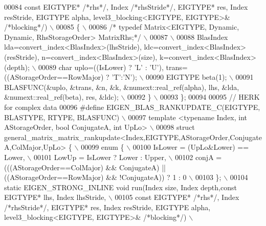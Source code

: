 \begin{DoxyCode}
00084 \textcolor{preprocessor}{                          const EIGTYPE* }\textcolor{comment}{/*rhs*/}\textcolor{preprocessor}{, Index }\textcolor{comment}{/*rhsStride*/}\textcolor{preprocessor}{, EIGTYPE* res, Index resStride,
       EIGTYPE alpha, level3\_blocking<EIGTYPE, EIGTYPE>& }\textcolor{comment}{/*blocking*/}\textcolor{preprocessor}{) \(\backslash\)}
00085 \textcolor{preprocessor}{  \{ \(\backslash\)}
00086 \textcolor{preprocessor}{  }\textcolor{comment}{/* typedef Matrix<EIGTYPE, Dynamic, Dynamic, RhsStorageOrder> MatrixRhs;*/}\textcolor{preprocessor}{ \(\backslash\)}
00087 \textcolor{preprocessor}{\(\backslash\)}
00088 \textcolor{preprocessor}{   BlasIndex lda=convert\_index<BlasIndex>(lhsStride), ldc=convert\_index<BlasIndex>(resStride),
       n=convert\_index<BlasIndex>(size), k=convert\_index<BlasIndex>(depth); \(\backslash\)}
00089 \textcolor{preprocessor}{   char uplo=((IsLower) ? 'L' : 'U'), trans=((AStorageOrder==RowMajor) ? 'T':'N'); \(\backslash\)}
00090 \textcolor{preprocessor}{   EIGTYPE beta(1); \(\backslash\)}
00091 \textcolor{preprocessor}{   BLASFUNC(&uplo, &trans, &n, &k, &numext::real\_ref(alpha), lhs, &lda, &numext::real\_ref(beta), res,
       &ldc); \(\backslash\)}
00092 \textcolor{preprocessor}{  \} \(\backslash\)}
00093 \textcolor{preprocessor}{\};}
00094 
00095 \textcolor{comment}{// HERK for complex data}
00096 \textcolor{preprocessor}{#define EIGEN\_BLAS\_RANKUPDATE\_C(EIGTYPE, BLASTYPE, RTYPE, BLASFUNC) \(\backslash\)}
00097 \textcolor{preprocessor}{template <typename Index, int AStorageOrder, bool ConjugateA, int  UpLo> \(\backslash\)}
00098 \textcolor{preprocessor}{struct general\_matrix\_matrix\_rankupdate<Index,EIGTYPE,AStorageOrder,ConjugateA,ColMajor,UpLo> \{ \(\backslash\)}
00099 \textcolor{preprocessor}{  enum \{ \(\backslash\)}
00100 \textcolor{preprocessor}{    IsLower = (UpLo&Lower) == Lower, \(\backslash\)}
00101 \textcolor{preprocessor}{    LowUp = IsLower ? Lower : Upper, \(\backslash\)}
00102 \textcolor{preprocessor}{    conjA = (((AStorageOrder==ColMajor) && ConjugateA) || ((AStorageOrder==RowMajor) && !ConjugateA)) ? 1 :
       0 \(\backslash\)}
00103 \textcolor{preprocessor}{  \}; \(\backslash\)}
00104 \textcolor{preprocessor}{  static EIGEN\_STRONG\_INLINE void run(Index size, Index depth,const EIGTYPE* lhs, Index lhsStride, \(\backslash\)}
00105 \textcolor{preprocessor}{                          const EIGTYPE* }\textcolor{comment}{/*rhs*/}\textcolor{preprocessor}{, Index }\textcolor{comment}{/*rhsStride*/}\textcolor{preprocessor}{, EIGTYPE* res, Index resStride,
       EIGTYPE alpha, level3\_blocking<EIGTYPE, EIGTYPE>& }\textcolor{comment}{/*blocking*/}\textcolor{preprocessor}{) \(\backslash\)}

\end{DoxyCode}
